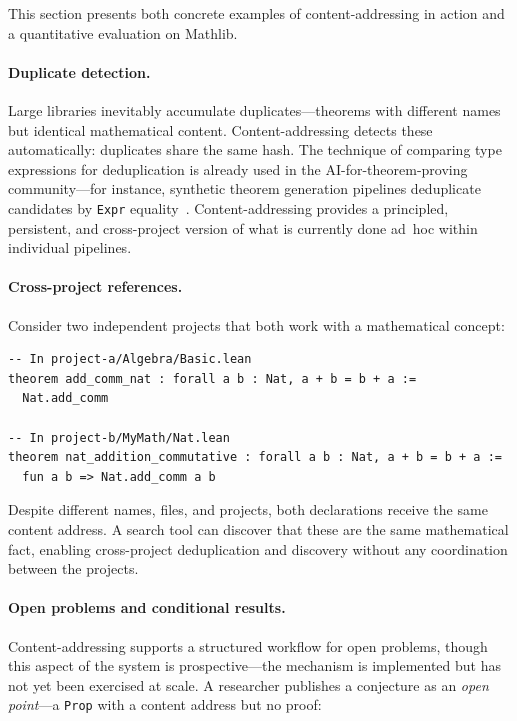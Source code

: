 This section presents both concrete examples of content-addressing in
action and a quantitative evaluation on Mathlib.

\paragraph{Duplicate detection.}
Large libraries inevitably accumulate duplicates---theorems with
different names but identical mathematical content.  Content-addressing
detects these automatically: duplicates share the same hash.  The
technique of comparing type expressions for deduplication is already
used in the AI-for-theorem-proving community---for instance, synthetic
theorem generation pipelines deduplicate candidates by \texttt{Expr}
equality~\cite{syntheticthm}.  Content-addressing provides a
principled, persistent, and cross-project version of what is currently
done ad~hoc within individual pipelines.

\paragraph{Cross-project references.}
Consider two independent projects that both work with a mathematical
concept:

\begin{lstlisting}[caption={Two projects proving the same lemma independently}]
-- In project-a/Algebra/Basic.lean
theorem add_comm_nat : forall a b : Nat, a + b = b + a :=
  Nat.add_comm

-- In project-b/MyMath/Nat.lean
theorem nat_addition_commutative : forall a b : Nat, a + b = b + a :=
  fun a b => Nat.add_comm a b
\end{lstlisting}

Despite different names, files, and projects, both declarations receive
the same content address.  A search tool can discover that these are the
same mathematical fact, enabling cross-project deduplication and
discovery without any coordination between the projects.

\paragraph{Open problems and conditional results.}
Content-addressing supports a structured workflow for open problems,
though this aspect of the system is prospective---the mechanism is
implemented but has not yet been exercised at scale.  A researcher
publishes a conjecture as an \emph{open point}---a \texttt{Prop} with a
content address but no proof:

